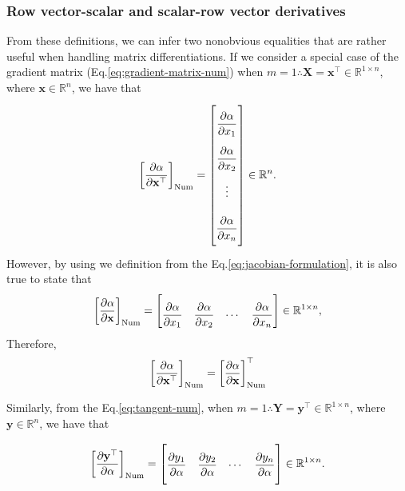 \documentclass{article}
\begin{document}
\subsubsection{Row vector-scalar and scalar-row vector derivatives}

From these definitions, we can infer two nonobvious equalities that are rather useful when handling matrix differentiations. If we consider a special case of the gradient matrix (Eq.\eqref{eq:gradient-matrix-num}) when $m=1 \therefore \mathbf{X} = \mathbf{x}^\top \in \mathbb{R}^{1\times n}$, where $\mathbf{x} \in \mathbb{R}^n$, we have that
\begin{align}
    \left[\dfrac{\partial \alpha}{\partial \mathbf{x}^\top}\right]_{\textnormal{Num}} = \renewcommand{\arraystretch}{2.6}\begin{bmatrix}
        \dfrac{\partial \alpha}{\partial x_{1}} \\
        \dfrac{\partial \alpha}{\partial x_{2}} \\
        \vdots \\
        \dfrac{\partial \alpha}{\partial x_{n}}\vspace{1.3ex}
    \end{bmatrix} \in \mathbb{R}^{n}.
\end{align}
However, by using we definition from the Eq.\eqref{eq:jacobian-formulation}, it is also true to state that
\begin{align}
    \left[\dfrac{\partial \alpha}{\partial \mathbf{x}}\right]_{\textnormal{Num}} = \begin{bmatrix} \dfrac{\partial \alpha}{\partial x_{1}} & \dfrac{\partial \alpha}{\partial x_{2}} & \cdots & \dfrac{\partial \alpha}{\partial x_{n}} \end{bmatrix} \in \mathbb{R}^{1 \times n},
\end{align}
Therefore,
\begin{align}
    \label{eq:hidden-num}
    \left[\dfrac{\partial \alpha}{\partial \mathbf{x}^\top}\right]_{\textnormal{Num}} = \left[\dfrac{\partial \alpha}{\partial \mathbf{x}}\right]_{\textnormal{Num}}^\top
\end{align}

Similarly, from the Eq.\eqref{eq:tangent-num}, when $m=1 \therefore \mathbf{Y} = \mathbf{y}^\top \in \mathbb{R}^{1\times n}$, where $\mathbf{y} \in \mathbb{R}^n$, we have that

\begin{align}
    \left[\dfrac{\partial \mathbf{y}^\top}{\partial \alpha}\right]_{\textnormal{Num}} = \renewcommand{\arraystretch}{2.6}\begin{bmatrix}
        \dfrac{\partial y_{1}}{\partial \alpha} &
        \dfrac{\partial y_{2}}{\partial \alpha} &
        \cdots &
        \dfrac{\partial y_{n}}{\partial \alpha}\vspace{1.3ex}
    \end{bmatrix} \in \mathbb{R}^{1 \times n}.
\end{align}
\end{document}
